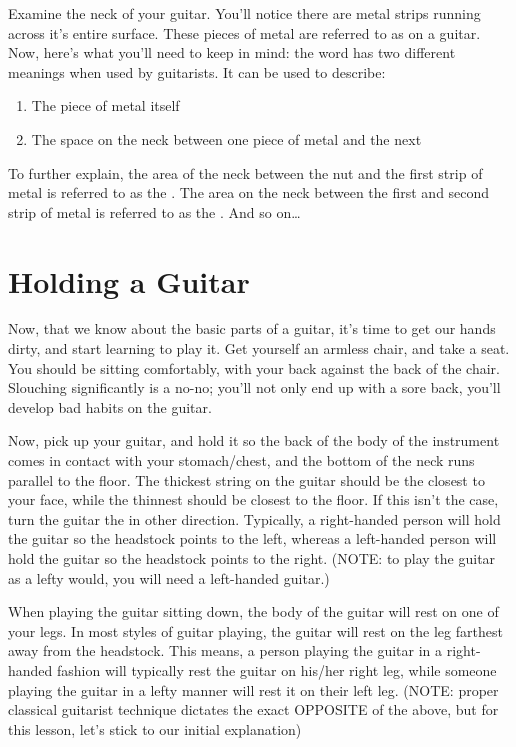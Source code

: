 Examine the neck of your guitar. You'll notice there are metal strips running
across it's entire surface. These pieces of metal are referred to as  on
a guitar. Now, here's what you'll need to keep in mind: the word  has two
different meanings when used by guitarists. It can be used to describe:
%
\begin{enumerate}
\item The piece of metal itself
\item The space on the neck between one piece of metal and the next 
\end{enumerate}
%
To further explain, the area of the neck between the nut and the first strip of
metal is referred to as the . The area on the neck between the
first and second strip of metal is referred to as the . And so
on\ldots{} 

\section{Holding a Guitar}
Now, that we know about the basic parts of a guitar, it's time to get our hands
dirty, and start learning to play it. Get yourself an armless chair, and take a
seat. You should be sitting comfortably, with your back against the back of the
chair. Slouching significantly is a no-no; you'll not only end up with a sore
back, you'll develop bad habits on the guitar.

Now, pick up your guitar, and hold it so the back of the body of the instrument
comes in contact with your stomach/chest, and the bottom of the neck runs
parallel to the floor. The thickest string on the guitar should be the closest
to your face, while the thinnest should be closest to the floor. If this isn't
the case, turn the guitar the in other direction. Typically, a right-handed
person will hold the guitar so the headstock points to the left, whereas a
left-handed person will hold the guitar so the headstock points to the right.
(NOTE: to play the guitar as a lefty would, you will need a left-handed
guitar.)

When playing the guitar sitting down, the body of the guitar will rest on one
of your legs. In most styles of guitar playing, the guitar will rest on the leg
farthest away from the headstock. This means, a person playing the guitar in a
right-handed fashion will typically rest the guitar on his/her right leg, while
someone playing the guitar in a lefty manner will rest it on their left leg.
(NOTE: proper classical guitarist technique dictates the exact OPPOSITE of the
above, but for this lesson, let's stick to our initial explanation)

